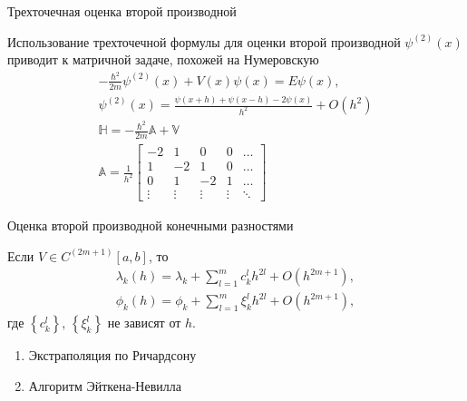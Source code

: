 \documentclass[10pt,pdf,hyperref={unicode},xcolor=dvipsnames]{beamer}
\newcommand{\bbA}{\mathbb{A}}
\newcommand{\bbV}{\mathbb{V}}
\newcommand{\bbH}{\mathbb{H}}
\newcommand{\lc}{\left\{}
\newcommand{\rc}{\right\}}
\newcommand{\psip}[1]{\psi^{(#1)}(x)}
\begin{document}
\begin{frame}{Трехточечная оценка второй производной}
    \begin{block}{}
        Использование трехточечной формулы для оценки второй производной $\psip{2}$ приводит к матричной задаче, похожей на Нумеровскую 
        \begin{gather}
            -\frac{ \hbar^2 }{ 2m } \psip{2} + V(x) \psi(x) = E \psi(x), \\
            \psip{2} = \frac{\psi(x+h) + \psi(x-h) - 2\psi(x)}{h^2} + O(h^2) \\
            \bbH = - \frac{\hbar^2}{2m} \bbA + \bbV \\
            \bbA = \frac{1}{h^2} 
            \begin{bmatrix}
                -2 & 1 & 0 & 0 & \dots \\
                1 & -2 & 1 & 0 & \dots \\
                0 & 1 & -2 & 1 & \dots \\
                \vdots & \vdots & \vdots & \vdots & \ddots
            \end{bmatrix}
        \end{gather}
    \end{block}
\end{frame}

\begin{frame}{Оценка второй производной конечными разностями}
    \begin{block}{}
        Если $V \in C^{(2m+1)}[a, b]$, то  
        \begin{gather}
            \lambda_k(h) = \lambda_k + \sum_{l=1}^{m} c_k^l h^{2l} + O(h^{2m+1}), \\
            \phi_k(h) = \phi_k + \sum_{l=1}^{m} \xi_k^l h^{2l} + O(h^{2m+1}),
        \end{gather}
        где $\lc c_k^l \rc$, $\lc \xi_k^l \rc$ не зависят от $h$.
        \begin{enumerate}
            \item Экстраполяция по Ричардсону
            \item Алгоритм Эйткена-Невилла 
        \end{enumerate}
    \end{block}
\end{frame}
\end{document}
